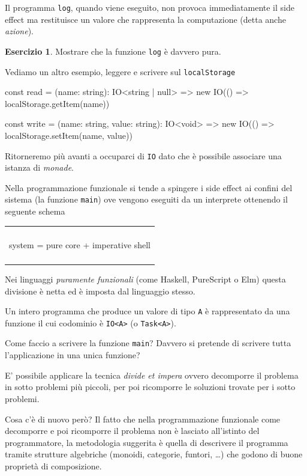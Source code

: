 \documentclass[12pt]{article}
\theoremstyle{definition}
\newtheorem{exercise}{Esercizio}[section]
\newenvironment{demo}
    {\begin{center}
    \begin{tabular}{|p{0.9\textwidth}|}
    \hline\\
    }
    {
    \\\\\hline
    \end{tabular}
    \end{center}
    }
\newenvironment{code}
  {\vspace{0.5cm} \VerbatimEnvironment\begin{typescriptcode}}
  {\end{typescriptcode} \vspace{0.2cm}}
\begin{document}
Il programma \texttt{log}, quando viene eseguito, non provoca immediatamente il side effect ma restituisce un valore che rappresenta
la computazione (detta anche \emph{azione}).

\begin{exercise}
Mostrare che la funzione \texttt{log} è davvero pura.
\end{exercise}

Vediamo un altro esempio, leggere e scrivere sul \texttt{localStorage}

\begin{code}
const read = (name: string): IO<string | null> =>
  new IO(() => localStorage.getItem(name))

const write = (name: string, value: string): IO<void> =>
  new IO(() => localStorage.setItem(name, value))
\end{code}

Ritorneremo più avanti a occuparci di \texttt{IO} dato che è possibile associare una istanza di \emph{monade}.

Nella programmazione funzionale si tende a spingere i side effect ai confini del sistema (la funzione \texttt{main})
ove vengono eseguiti da un interprete ottenendo il seguente schema

\begin{demo}
\begin{center}
system = pure core + imperative shell
\end{center}
\end{demo}

Nei linguaggi \emph{puramente funzionali} (come Haskell, PureScript o Elm) questa divisione è netta ed è imposta dal linguaggio stesso.

Un intero programma che produce un valore di tipo \texttt{A} è rappresentato da una funzione il cui codominio è \texttt{IO<A>} (o \texttt{Task<A>}).

Come faccio a scrivere la funzione \texttt{main}? Davvero si pretende di scrivere tutta l'applicazione in una unica funzione?

E' possibile applicare la tecnica \emph{divide et impera} ovvero decomporre il problema in sotto problemi più piccoli,
per poi ricomporre le soluzioni trovate per i sotto problemi.

Cosa c'è di nuovo però? Il fatto che nella programmazione funzionale come decomporre e poi ricomporre il problema non è lasciato
all'istinto del programmatore, la metodologia suggerita è quella di descrivere il programma tramite strutture algebriche
(monoidi, categorie, funtori, \ldots) che godono di buone proprietà di composizione.
\end{document}
